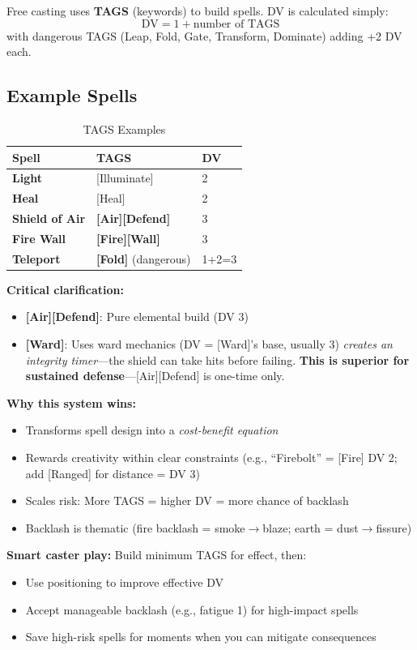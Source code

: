 \documentclass[11pt]{article}
\begin{document}
Free casting uses \textbf{TAGS} (keywords) to build spells. DV is calculated simply:
\[
\text{DV} = 1 + \text{number of TAGS}
\]
with dangerous TAGS (Leap, Fold, Gate, Transform, Dominate) adding +2 DV each.

\subsection{Example Spells}
\begin{table}[h]
\centering
\caption{TAGS Examples}
\begin{tabular}{>{\bfseries}l l l}
\toprule
Spell & TAGS & DV \\
\midrule
Light & [Illuminate] & 2 \\
Heal & [Heal] & 2 \\
Shield of Air & \textbf{[Air][Defend]} & 3 \\
Fire Wall & \textbf{[Fire][Wall]} & 3 \\
Teleport & \textbf{[Fold]} (dangerous) & 1+2=3 \\
\bottomrule
\end{tabular}
\end{table}

\textbf{Critical clarification:} 
\begin{itemize}
    \item \textbf{[Air][Defend]}: Pure elemental build (DV 3)
    \item \textbf{[Ward]}: Uses ward mechanics (DV = [Ward]'s base, usually 3) \textit{creates an integrity timer}---the shield can take hits before failing. \textbf{This is superior for sustained defense}---[Air][Defend] is one-time only.
\end{itemize}

\textbf{Why this system wins:}
\begin{itemize}
    \item Transforms spell design into a \textit{cost-benefit equation}
    \item Rewards creativity within clear constraints (e.g., ``Firebolt'' = [Fire] DV 2; add [Ranged] for distance = DV 3)
    \item Scales risk: More TAGS = higher DV = more chance of backlash
    \item Backlash is thematic (fire backlash = smoke$\rightarrow$blaze; earth = dust$\rightarrow$fissure)
\end{itemize}

\textbf{Smart caster play:} Build minimum TAGS for effect, then:
\begin{itemize}
    \item Use positioning to improve effective DV
    \item Accept manageable backlash (e.g., fatigue 1) for high-impact spells
    \item Save high-risk spells for moments when you can mitigate consequences
\end{itemize}
\end{document}
